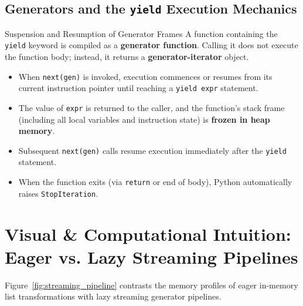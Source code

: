 \subsection{Generators and the \texttt{yield} Execution Mechanics}

\begin{theorembox}{Suspension and Resumption of Generator Frames}
 
A function containing the \texttt{yield} keyword is compiled as a \textbf{generator function}. Calling it does not execute the function body; instead, it returns a \textbf{generator-iterator} object.
\begin{itemize}
    \item When \texttt{next(gen)} is invoked, execution commences or resumes from its current instruction pointer until reaching a \texttt{yield expr} statement.
    \item The value of \texttt{expr} is returned to the caller, and the function's stack frame (including all local variables and instruction state) is \textbf{frozen in heap memory}.
    \item Subsequent \texttt{next(gen)} calls resume execution immediately after the \texttt{yield} statement.
    \item When the function exits (via \texttt{return} or end of body), Python automatically raises \texttt{StopIteration}.
\end{itemize}
\end{theorembox}

\section{Visual \& Computational Intuition: Eager vs. Lazy Streaming Pipelines}

Figure~\ref{fig:streaming_pipeline} contrasts the memory profiles of eager in-memory list transformations with lazy streaming generator pipelines.

